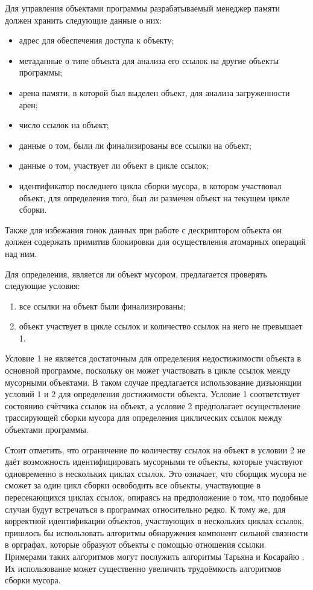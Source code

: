 Для управления объектами программы разрабатываемый менеджер памяти должен хранить следующие данные о них:

\begin{itemize}[label*=---]
	\item адрес для обеспечения доступа к объекту;
	\item метаданные о типе объекта для анализа его ссылок на другие объекты программы;
	\item арена памяти, в которой был выделен объект, для анализа загруженности арен;
	\item число ссылок на объект;
	\item данные о том, были ли финализированы все ссылки на объект;
	\item данные о том, участвует ли объект в цикле ссылок;
	\item идентификатор последнего цикла сборки мусора, в котором участвовал объект, для определения того, был ли размечен объект на текущем цикле сборки.
\end{itemize}

Также для избежания гонок данных при работе с дескриптором объекта он должен содержать примитив блокировки для осуществления атомарных операций над ним.

Для определения, является ли объект мусором, предлагается проверять следующие условия:

\begin{enumerate}[label*=\arabic*)]
	\item все ссылки на объект были финализированы;
	\item объект участвует в цикле ссылок и количество ссылок на него не превышает 1.
\end{enumerate}

Условие 1 не является достаточным для определения недостижимости объекта в основной программе, поскольку он может участвовать в цикле ссылок между мусорными объектами. В таком случае предлагается использование дизъюнкции условий 1 и 2 для определения достижимости объекта. Условие 1 соответствует состоянию счётчика ссылок на объект, а условие 2 предполагает осуществление трассирующей сборки мусора для определения циклических ссылок между объектами программы.

Стоит отметить, что ограничение по количеству ссылок на объект в условии 2 не даёт возможность идентифицировать мусорными те объекты, которые участвуют одновременно в нескольких циклах ссылок. Это означает, что сборщик мусора не сможет за один цикл сборки освободить все объекты, участвующие в пересекающихся циклах ссылок, опираясь на предположение о том, что подобные случаи будут встречаться в программах относительно редко. К тому же, для корректной идентификации объектов, участвующих в нескольких циклах ссылок, пришлось бы использовать алгоритмы обнаружения компонент сильной связности в орграфах, которые образуют объекты с помощью отношения ссылки. Примерами таких алгоритмов могут послужить алгоритмы Тарьяна и Косарайю \cite{graph_algorithms}. Их использование может существенно увеличить трудоёмкость алгоритмов сборки мусора.

